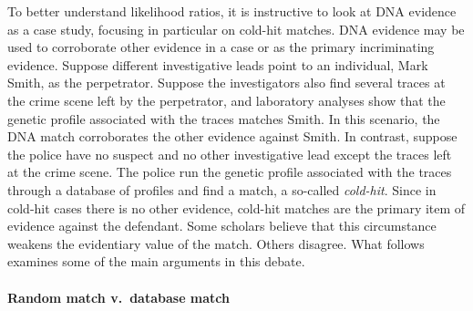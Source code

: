 \documentclass{article}
\begin{document}
To better understand likelihood ratios, it is instructive to look at DNA evidence as a case study, focusing in particular on cold-hit matches. DNA evidence may be used to corroborate other evidence in a case or as the primary  incriminating evidence. Suppose different investigative leads point to an individual, Mark Smith, as the perpetrator. Suppose the investigators also find several traces at the crime scene left by the perpetrator, and laboratory analyses show that the genetic profile associated with the traces matches Smith. In this scenario, the DNA match corroborates the other evidence against Smith.  In contrast, suppose the police have no  suspect and no  other investigative lead except the traces left at the crime scene. The police run the genetic profile associated with the traces through a database of profiles and  find a match, a so-called  \textit{cold-hit}.
    Since in cold-hit cases there is no other evidence, cold-hit matches are  the primary item of evidence against the defendant. Some scholars believe that this circumstance weakens the evidentiary value of the match. Others disagree.  What follows examines some of the main arguments in this debate.
    



   
   
   \paragraph{Random match v.~database match}
   
\end{document}
